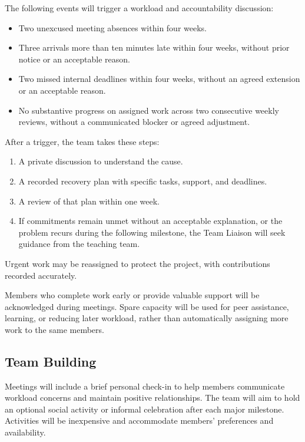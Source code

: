 \documentclass{article}
\begin{document}
The following events will trigger a workload and accountability
discussion:

\begin{itemize}
    \item Two unexcused meeting absences within four weeks.
    \item Three arrivals more than ten minutes late within four weeks,
    without prior notice or an acceptable reason.
    \item Two missed internal deadlines within four weeks, without
    an agreed extension or an acceptable reason.
    \item No substantive progress on assigned work across two
    consecutive weekly reviews, without a communicated blocker
    or agreed adjustment.
\end{itemize}

After a trigger, the team takes these steps:

\begin{enumerate}
    \item A private discussion to understand the cause.
    \item A recorded recovery plan with specific tasks, support, and
    deadlines.
    \item A review of that plan within one week.
    \item If commitments remain unmet without an acceptable explanation,
    or the problem recurs during the following milestone, the Team Liaison
    will seek guidance from the teaching team.
\end{enumerate}

Urgent work may be reassigned to protect the project, with contributions
recorded accurately.

Members who complete work early or provide valuable support will
be acknowledged during meetings. Spare capacity will be used for
peer assistance, learning, or reducing later workload, rather than
automatically assigning more work to the same members.

\subsection*{Team Building}

Meetings will include a brief personal check-in to help members
communicate workload concerns and maintain positive relationships.
The team will aim to hold an optional social activity or informal
celebration after each major milestone. Activities will be
inexpensive and accommodate members' preferences and availability.
\end{document}
